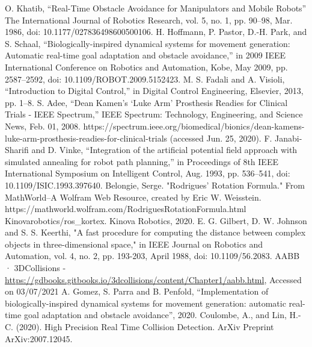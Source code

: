 \documentclass[a4paper, 11.5pt, conference]{ieeeconf}      %
\begin{document}
\begin{thebibliography}{10}
	
 O. Khatib, “Real-Time Obstacle Avoidance for Manipulators and Mobile Robots” The International Journal of Robotics Research, vol. 5, no. 1, pp. 90–98, Mar. 1986, doi: 10.1177/027836498600500106.
 H. Hoffmann, P. Pastor, D.-H. Park, and S. Schaal, “Biologically-inspired dynamical systems for movement generation: Automatic real-time goal adaptation and obstacle avoidance,” in 2009 IEEE International Conference on Robotics and Automation, Kobe, May 2009, pp. 2587–2592, doi: 10.1109/ROBOT.2009.5152423.
 M. S. Fadali and A. Visioli, “Introduction to Digital Control,” in Digital Control Engineering, Elsevier, 2013, pp. 1–8.
 S. Adee, “Dean Kamen’s ‘Luke Arm’ Prosthesis Readies for Clinical Trials - IEEE Spectrum,” IEEE Spectrum: Technology, Engineering, and Science News, Feb. 01, 2008. https://spectrum.ieee.org/biomedical/bionics/dean-kamens-luke-arm-prosthesis-readies-for-clinical-trials (accessed Jun. 25, 2020).
 F. Janabi-Sharifi and D. Vinke, “Integration of the artificial potential field approach with simulated annealing for robot path planning,” in Proceedings of 8th IEEE International Symposium on Intelligent Control, Aug. 1993, pp. 536–541, doi: 10.1109/ISIC.1993.397640.
  Belongie, Serge. "Rodrigues' Rotation Formula." From MathWorld--A Wolfram Web Resource, created by Eric W. Weisstein. https://mathworld.wolfram.com/RodriguesRotationFormula.html 
 Kinovarobotics/ros\_kortex. Kinova Robotics, 2020.
 E. G. Gilbert, D. W. Johnson and S. S. Keerthi, "A fast procedure for computing the distance between complex objects in three-dimensional space," in IEEE Journal on Robotics and Automation, vol. 4, no. 2, pp. 193-203, April 1988, doi: 10.1109/56.2083.
 AABB · 3DCollisions - \url{https://gdbooks.gitbooks.io/3dcollisions/content/Chapter1/aabb.html}, Accessed on 03/07/2021
 A. Gomez, S. Parra and B. Penfold, “Implementation of biologically-inspired dynamical systems for movement generation: automatic real-time goal adaptation and obstacle avoidance”, 2020.
 Coulombe, A., and Lin, H.-C. (2020). High Precision Real Time Collision Detection. ArXiv Preprint ArXiv:2007.12045.



\end{thebibliography}
\end{document}
